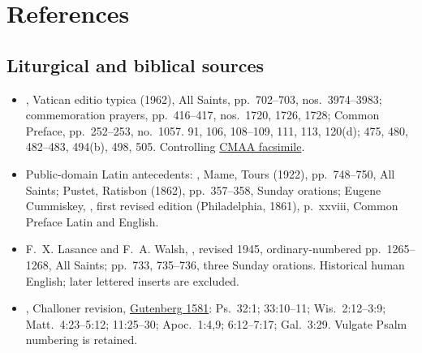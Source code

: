 \section{References}
\subsection{Liturgical and biblical sources}
\begin{itemize}
\item {}, Vatican editio typica (1962),
All Saints, pp.~702--703, nos.~3974--3983; commemoration prayers,
pp.~416--417, nos.~1720, 1726, 1728; Common Preface,
pp.~252--253, no.~1057.  91, 106,
108--109, 111, 113, 120(d); 
475, 480, 482--483, 494(b), 498, 505. Controlling
\href{https://media.churchmusicassociation.org/pdf/missale62.pdf}{CMAA facsimile}.
\item Public-domain Latin antecedents: ,
Mame, Tours (1922), pp.~748--750, All Saints;
Pustet, Ratisbon (1862), pp.~357--358, Sunday orations;
Eugene Cummiskey, , first revised edition
(Philadelphia, 1861), p.~xxviii, Common Preface Latin and English.
\item F.~X. Lasance and F.~A. Walsh, ,
revised 1945, ordinary-numbered pp.~1265--1268, All Saints;
pp.~733, 735--736, three Sunday orations. Historical human
English; later lettered inserts are excluded.
\item {}, Challoner revision,
\href{https://www.gutenberg.org/ebooks/1581}{Gutenberg 1581}:
Ps.~32:1; 33:10--11; Wis.~2:12--3:9; Matt.~4:23--5:12;
11:25--30; Apoc.~1:4,9; 6:12--7:17; Gal.~3:29.
Vulgate Psalm numbering is retained.
\end{itemize}

